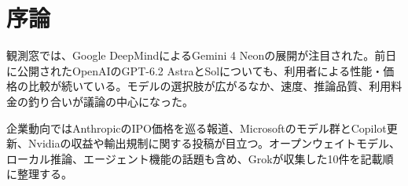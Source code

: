 \section{序論}
観測窓では、Google DeepMindによるGemini 4 Neonの展開が注目された。前日に公開されたOpenAIのGPT-6.2 AstraとSolについても、利用者による性能・価格の比較が続いている。モデルの選択肢が広がるなか、速度、推論品質、利用料金の釣り合いが議論の中心になった。

企業動向ではAnthropicのIPO価格を巡る報道、Microsoftのモデル群とCopilot更新、Nvidiaの収益や輸出規制に関する投稿が目立つ。オープンウェイトモデル、ローカル推論、エージェント機能の話題も含め、Grokが収集した10件を記載順に整理する。
